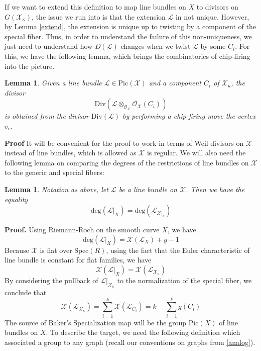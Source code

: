 \documentclass{article}
\newtheorem{lemma}[theorem]{Lemma}
\begin{document}
If we want to extend this definition to map line bundles on $X$ to divisors on $G(\mathcal{X}_{\mathcal{\kappa}})$, the issue we run into is that the extension $\mathcal{L}$ in not unique. However, by Lemma \ref{extend}, the extension is unique up to twisting by a component of the special fiber. Thus, in order to understand the failure of this non-uniqueness, we just need to understand how $D(\mathcal{L})$ changes when we twist $\mathcal{L}$ by some $C_i$. For this, we have the following lemma, which brings the combinatorics of chip-firing into the picture.
\begin{lemma}
Given a line bundle $\mathcal{L}\in \text{Pic}(\mathcal{X})$ and a component $C_i$ of $\mathcal{X}_{\kappa}$, the divisor
\[
\text{Div}(\mathcal{L}\otimes_{\mathcal{O}_{\mathcal{X}}}\mathcal{O}_{\mathcal{X}}(C_i))
\]
is obtained from the divisor $\text{Div}(\mathcal{L})$ by performing a chip-firing move the vertex $v_i$. 
\end{lemma}
\textbf{Proof} It will be convenient for the proof to work in terms of Weil divisors on $\mathcal{X}$ instead of line bundles, which is allowed as $\mathcal{X}$ is regular. 
\newline
\newline
We will also need the following lemma on comparing the degrees of the restrictions of line bundles on $\mathcal{X}$ to the generic and special fibers:
\begin{lemma}
Notation as above, let $\mathcal{L}$ be a line bundle on $\mathcal{X}$. Then we have the equality
\[
\text{deg}(\mathcal{L}|_{X}) = \text{deg}(\mathcal{L}_{\mathcal{X}|_{\kappa}})
\]
\end{lemma}
\textbf{Proof.} Using Riemann-Roch on the smooth curve $X$, we have 
\[
\text{deg}(\mathcal{L}|_X)= \mathcal{X}(\mathcal{L}_X) + g - 1
\]
Because $\mathcal{X}$ is flat over $\text{Spec}(R)$, using the fact that the Euler characteristic of line bundle is constant for flat families, we have 
\[
\mathcal{X}(\mathcal{L}|_X) = \mathcal{X}(\mathcal{L}_{\mathcal{X}_{\mathcal{\kappa}}})
\]
By considering the pullback of $\mathcal{L}|_{\mathcal{X}_{\kappa}}$ to the normalization of the special fiber, we conclude that 
\[
\mathcal{X}(\mathcal{L}_{\mathcal{X}_{\mathcal{\kappa}}}) = \sum_{i = 1}^{k}\mathcal{X}(\mathcal{L}_{C_i}) = k - 
\sum_{i = 1}^{k}g(C_i)
\]
\newline
\newline
\newline
\newline
The source of Baker's Specialization map will be the group $\text{Pic}(X)$ of line bundles on $X$. To describe the target, we need the following definition which associated a group to any graph (recall our conventions on graphs from \ref{analog}). 


\end{document}
